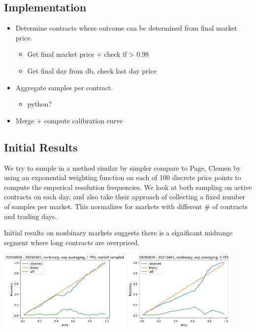 \documentclass[
]{article}
\providecommand{\tightlist}{%
  \setlength{\itemsep}{0pt}\setlength{\parskip}{0pt}}
\renewcommand{\tightlist}{%
  \setlength{\itemsep}{1pt}\setlength{\parskip}{1pt}}
\begin{document}
\hypertarget{implementation}{%
\subsection{Implementation}\label{implementation}}

\begin{itemize}
\tightlist
\item
  Determine contracts where outcome can be determined from final market
  price.

  \begin{itemize}
  \tightlist
  \item
    Get final market price + check if \textgreater{} 0.98
  \item
    Get final day from db, check last day price
  \end{itemize}
\item
  Aggregate samples per contract.

  \begin{itemize}
  \tightlist
  \item
    python?
  \end{itemize}
\item
  Merge + compute calibration curve
\end{itemize}

\hypertarget{initial-results}{%
\subsection{Initial Results}\label{initial-results}}

We try to sample in a method similar by simpler compare to Page, Clemen
by using an exponential weighting function on each of 100 discrete price
points to compute the emperical resolution frequencies. We look at both
sampling on active contracts on each day, and also take their approach
of collecting a fixed number of samples per market. This normalizes for
markets with different \# of contracts and trading days.

Initial results on nonbinary markets suggests there is a significant
midrange segment where long contracts are overpriced.

\includegraphics[width=\textwidth,height=1.5625in]{pos_nonbinary_market_sampled.png}
\includegraphics[width=\textwidth,height=1.5625in]{pos_nonbinary.png}
\end{document}
